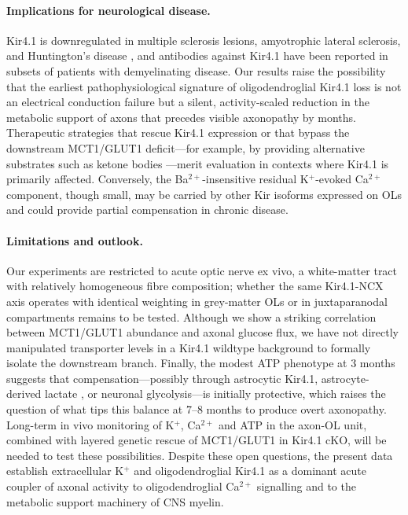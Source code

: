 \documentclass[11pt,a4paper]{article}
\begin{document}
\paragraph{Implications for neurological disease.} Kir4.1 is downregulated in multiple sclerosis lesions, amyotrophic lateral sclerosis, and Huntington's disease \citep{Tong2014,Schirmer2018,Stumpf2019}, and antibodies against Kir4.1 have been reported in subsets of patients with demyelinating disease. Our results raise the possibility that the earliest pathophysiological signature of oligodendroglial Kir4.1 loss is not an electrical conduction failure but a silent, activity-scaled reduction in the metabolic support of axons that precedes visible axonopathy by months. Therapeutic strategies that rescue Kir4.1 expression or that bypass the downstream MCT1/GLUT1 deficit---for example, by providing alternative substrates such as ketone bodies \citep{Stumpf2019}---merit evaluation in contexts where Kir4.1 is primarily affected. Conversely, the Ba$^{2+}$-insensitive residual K$^+$-evoked Ca$^{2+}$ component, though small, may be carried by other Kir isoforms expressed on OLs \citep{Battefeld2019,Suminaite2019} and could provide partial compensation in chronic disease.

\paragraph{Limitations and outlook.} Our experiments are restricted to acute optic nerve ex vivo, a white-matter tract with relatively homogeneous fibre composition; whether the same Kir4.1-NCX axis operates with identical weighting in grey-matter OLs or in juxtaparanodal compartments remains to be tested. Although we show a striking correlation between MCT1/GLUT1 abundance and axonal glucose flux, we have not directly manipulated transporter levels in a Kir4.1 wildtype background to formally isolate the downstream branch. Finally, the modest ATP phenotype at 3 months suggests that compensation---possibly through astrocytic Kir4.1, astrocyte-derived lactate \citep{Tekkok2005}, or neuronal glycolysis---is initially protective, which raises the question of what tips this balance at 7--8 months to produce overt axonopathy. Long-term in vivo monitoring of K$^+$, Ca$^{2+}$ and ATP in the axon-OL unit, combined with layered genetic rescue of MCT1/GLUT1 in Kir4.1 cKO, will be needed to test these possibilities. Despite these open questions, the present data establish extracellular K$^+$ and oligodendroglial Kir4.1 as a dominant acute coupler of axonal activity to oligodendroglial Ca$^{2+}$ signalling and to the metabolic support machinery of CNS myelin.
\end{document}
